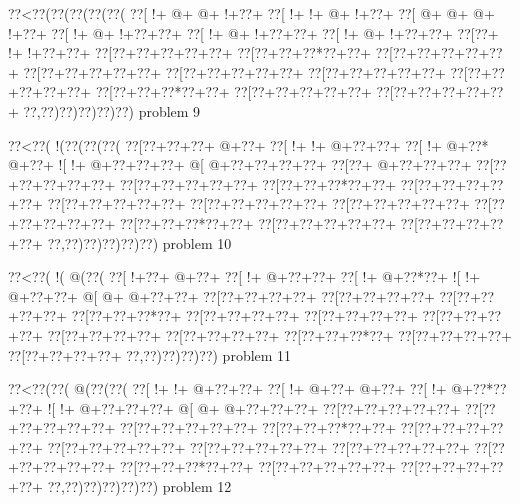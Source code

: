 \vbox{\vbox{\goo
\0??<\0??(\0??(\0??(\0??(\0??(
\0??[\- !+\- @+\- @+\- !+\0??+
\0??[\- !+\- !+\- @+\- !+\0??+
\0??[\- @+\- @+\- @+\- !+\0??+
\0??[\- !+\- @+\- !+\0??+\0??+
\0??[\- !+\- @+\- !+\0??+\0??+
\0??[\- !+\- @+\- !+\0??+\0??+
\0??[\0??+\- !+\- !+\0??+\0??+
\0??[\0??+\0??+\0??+\0??+\0??+
\0??[\0??+\0??+\0??*\0??+\0??+
\0??[\0??+\0??+\0??+\0??+\0??+
\0??[\0??+\0??+\0??+\0??+\0??+
\0??[\0??+\0??+\0??+\0??+\0??+
\0??[\0??+\0??+\0??+\0??+\0??+
\0??[\0??+\0??+\0??+\0??+\0??+
\0??[\0??+\0??+\0??*\0??+\0??+
\0??[\0??+\0??+\0??+\0??+\0??+
\0??[\0??+\0??+\0??+\0??+\0??+
\0??,\0??)\0??)\0??)\0??)\0??)
}
\hfil problem 9\hfil\break
}

\vbox{\vbox{\goo
\0??<\0??(\- !(\0??(\0??(\0??(
\0??[\0??+\0??+\0??+\- @+\0??+
\0??[\- !+\- !+\- @+\0??+\0??+
\0??[\- !+\- @+\0??*\- @+\0??+
\- ![\- !+\- @+\0??+\0??+\0??+
\- @[\- @+\0??+\0??+\0??+\0??+
\0??[\0??+\- @+\0??+\0??+\0??+
\0??[\0??+\0??+\0??+\0??+\0??+
\0??[\0??+\0??+\0??+\0??+\0??+
\0??[\0??+\0??+\0??*\0??+\0??+
\0??[\0??+\0??+\0??+\0??+\0??+
\0??[\0??+\0??+\0??+\0??+\0??+
\0??[\0??+\0??+\0??+\0??+\0??+
\0??[\0??+\0??+\0??+\0??+\0??+
\0??[\0??+\0??+\0??+\0??+\0??+
\0??[\0??+\0??+\0??*\0??+\0??+
\0??[\0??+\0??+\0??+\0??+\0??+
\0??[\0??+\0??+\0??+\0??+\0??+
\0??,\0??)\0??)\0??)\0??)\0??)
}
\hfil problem 10\hfil\break
}

\vbox{\vbox{\goo
\0??<\0??(\- !(\- @(\0??(
\0??[\- !+\0??+\- @+\0??+
\0??[\- !+\- @+\0??+\0??+
\0??[\- !+\- @+\0??*\0??+
\- ![\- !+\- @+\0??+\0??+
\- @[\- @+\- @+\0??+\0??+
\0??[\0??+\0??+\0??+\0??+
\0??[\0??+\0??+\0??+\0??+
\0??[\0??+\0??+\0??+\0??+
\0??[\0??+\0??+\0??*\0??+
\0??[\0??+\0??+\0??+\0??+
\0??[\0??+\0??+\0??+\0??+
\0??[\0??+\0??+\0??+\0??+
\0??[\0??+\0??+\0??+\0??+
\0??[\0??+\0??+\0??+\0??+
\0??[\0??+\0??+\0??*\0??+
\0??[\0??+\0??+\0??+\0??+
\0??[\0??+\0??+\0??+\0??+
\0??,\0??)\0??)\0??)\0??)
}
\hfil problem 11\hfil\break
}

\vbox{\vbox{\goo
\0??<\0??(\0??(\- @(\0??(\0??(
\0??[\- !+\- !+\- @+\0??+\0??+
\0??[\- !+\- @+\0??+\- @+\0??+
\0??[\- !+\- @+\0??*\0??+\0??+
\- ![\- !+\- @+\0??+\0??+\0??+
\- @[\- @+\- @+\0??+\0??+\0??+
\0??[\0??+\0??+\0??+\0??+\0??+
\0??[\0??+\0??+\0??+\0??+\0??+
\0??[\0??+\0??+\0??+\0??+\0??+
\0??[\0??+\0??+\0??*\0??+\0??+
\0??[\0??+\0??+\0??+\0??+\0??+
\0??[\0??+\0??+\0??+\0??+\0??+
\0??[\0??+\0??+\0??+\0??+\0??+
\0??[\0??+\0??+\0??+\0??+\0??+
\0??[\0??+\0??+\0??+\0??+\0??+
\0??[\0??+\0??+\0??*\0??+\0??+
\0??[\0??+\0??+\0??+\0??+\0??+
\0??[\0??+\0??+\0??+\0??+\0??+
\0??,\0??)\0??)\0??)\0??)\0??)
}
\hfil problem 12\hfil\break
}

